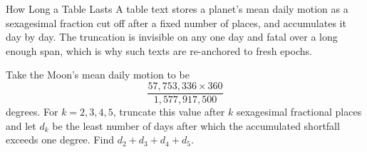 \begin{problem}{How Long a Table Lasts}
A table text stores a planet's mean daily motion as a sexagesimal fraction cut off after a fixed number of places, and accumulates it day by day. The truncation is invisible on any one day and fatal over a long enough span, which is why such texts are re-anchored to fresh epochs.

Take the Moon's mean daily motion to be
    \[
    \frac{57{,}753{,}336\times360}{1{,}577{,}917{,}500}
    \]
degrees. For \(k=2,3,4,5\), truncate this value after \(k\) sexagesimal fractional places and let \(d_k\) be the least number of days after which the accumulated shortfall exceeds one degree. Find \(d_2+d_3+d_4+d_5\).
\end{problem}
    